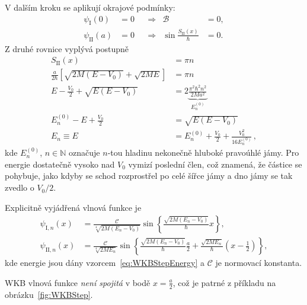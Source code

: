\begin{solution}
	V dalším kroku se aplikují okrajové podmínky:
	\begin{subequations}
		\begin{align}
			\psi_{\mathrm{I}}(0)&=0 && \Longrightarrow & \mathcal{B}&=0,\\
			\psi_{\mathrm{II}}(a)&=0 && \Longrightarrow & \sin{\frac{S_{\mathrm{II}}(x)}{\hbar}}&=0.
		\end{align}			
	\end{subequations}
	Z druhé rovnice vyplývá postupně
	\begin{align}
		S_{\mathrm{II}}(x)&=\pi n\nonumber\\
		\frac{a}{2\hbar}\left[\sqrt{2M(E-V_{0})}+\sqrt{2ME}\right]&=\pi n\nonumber\\
		E-\frac{V_{0}}{2}+\sqrt{E(E-V_{0})}&=2\underbrace{\frac{\pi^{2}\hbar^{2}n^{2}}{2Ma^{2}}}_{E_{n}^{(0)}}\nonumber\\
		E_{n}^{(0)}-E+\frac{V_{0}}{2}&=\sqrt{E(E-V_{0})}\nonumber\\
		E_{n}\equiv E&=E_{n}^{(0)}+\frac{V_{0}}{2}+\frac{V_{0}^{2}}{16E_{n}^{(0)}}\,,
		\label{eq:WKBStepEnergy}
	\end{align}
	kde $E_{n}^{(0)}$, $n\in\mathbb{N}$ označuje $n$-tou hladinu nekonečně hluboké pravoúhlé jámy.
	Pro energie dostatečně vysoko nad $V_{0}$ vymizí poslední člen, což znamená, že částice se pohybuje, jako kdyby se schod rozprostřel po celé šířce jámy a dno jámy se tak zvedlo o $V_{0}/2$.

	Explicitně vyjádřená vlnová funkce je
	\begin{subequations}
		\begin{align}
			\psi_{\mathrm{I},n}(x)&=\frac{\mathcal{C}}{\sqrt[4]{2M\left(E_{n}-V_{0}\right)}}\sin{\left\{\frac{\sqrt{2M\left(E_{n}-V_{0}\right)}}{\hbar}x\right\}},\\
			\psi_{\mathrm{II},n}(x)&=\frac{\mathcal{C}}{\sqrt[4]{2ME_{n}}}\sin{\left\{\frac{\sqrt{2M\left(E_{n}-V_{0}\right)}}{\hbar}\frac{a}{2}+\frac{\sqrt{2ME_{n}}}{\hbar}\left(x-\frac{1}{2}\right)\right\}},
		\end{align}			
	\end{subequations}
	kde energie jsou dány vzorcem~\eqref{eq:WKBStepEnergy} a $\mathcal{C}$ je normovací konstanta.
	
	WKB vlnová funkce \emph{není spojitá} v bodě $x=\frac{a}{2}$, což je patrné z příkladu na obrázku~\ref{fig:WKBStep}.
\end{solution}
